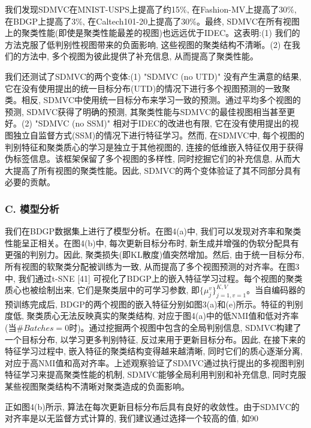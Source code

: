 \documentclass{article}
\begin{document}
我们发现SDMVC在MNIST-USPS上提高了约15\%, 在Fashion-MV上提高了30\%, 在BDGP上提高了3\%, 在Caltech101-20上提高了30\%。最终, SDMVC在所有视图上的聚类性能(即使是聚类性能最差的视图)也远远优于IDEC。这表明:(1) 我们的方法克服了低判别性视图带来的负面影响, 这些视图的聚类结构不清晰。(2) 在我们的方法中, 多个视图为彼此提供了补充信息, 从而提高了聚类性能。

我们还测试了SDMVC的两个变体:(1) "SDMVC (no UTD)" 没有产生满意的结果, 它在没有使用提出的统一目标分布(UTD)的情况下进行多个视图预测的一致聚类。相反, SDMVC中使用统一目标分布来学习一致的预测。通过平均多个视图的预测, SDMVC获得了明确的预测, 其聚类性能与SDMVC的最佳视图相当甚至更好。(2) "SDMVC (no SSM)" 相对于IDEC的改进也有限, 它在没有使用提出的视图独立自监督方式(SSM)的情况下进行特征学习。然而, 在SDMVC中, 每个视图的判别特征和聚类质心的学习是独立于其他视图的, 连接的低维嵌入特征仅用于获得伪标签信息。该框架保留了多个视图的多样性, 同时挖掘它们的补充信息, 从而大大提高了所有视图的聚类性能。因此, SDMVC的两个变体验证了其不同部分具有必要的贡献。

\subsubsection*{C. 模型分析}

我们在BDGP数据集上进行了模型分析。在图4(a)中, 我们可以发现对齐率和聚类性能呈正相关。在图4(b)中, 每次更新目标分布时, 新生成并增强的伪软分配具有更强的判别力。因此, 聚类损失(即KL散度)值突然增加。然后, 由于统一目标分布, 所有视图的软聚类分配被训练为一致, 从而提高了多个视图预测的对齐率。在图3中, 我们通过t-SNE [41] 可视化了BDGP上的嵌入特征学习过程。每个视图的聚类质心也被绘制出来, 它们是聚类层中的可学习参数, 即$\{\mu^v_j\}_{j=1, v=1}^{K, V}$。当自编码器的预训练完成后, BDGP的两个视图的嵌入特征分别如图3(a)和(e)所示。特征的判别度低, 聚类质心无法反映真实的聚类结构, 对应于图4(a)中的低NMI值和低对齐率(当$\#Batches=0$时)。通过挖掘两个视图中包含的全局判别信息, SDMVC构建了一个目标分布, 以学习更多判别特征, 反过来用于更新目标分布。因此, 在接下来的特征学习过程中, 嵌入特征的聚类结构变得越来越清晰, 同时它们的质心逐渐分离, 对应于高NMI值和高对齐率。上述观察验证了SDMVC通过执行提出的多视图判别特征学习来提高聚类性能的机制, SDMVC能够全局利用判别和补充信息, 同时克服某些视图聚类结构不清晰对聚类造成的负面影响。

正如图4(b)所示, 算法在每次更新目标分布后具有良好的收敛性。由于SDMVC的对齐率是以无监督方式计算的, 我们建议通过选择一个较高的值, 如90%
\end{document}
